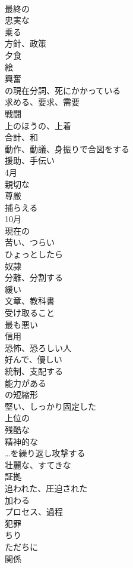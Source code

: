 \documentclass[8pt]{extreport}
\begin{document}
\begin{CJK}{UTF8}{min}
\\	最終の	
\\	忠実な	
\\	乗る	
\\	方針、政策	
\\	夕食	
\\	絵	
\\	興奮	
\\	の現在分詞、死にかかっている	
\\	求める、要求、需要	
\\	戦闘	
\\	上のほうの、上着	
\\	合計、和	
\\	動作、動議、身振りで合図をする	
\\	援助、手伝い	
\\	4月	
\\	親切な	
\\	尊厳	
\\	捕らえる	
\\	10月	
\\	現在の	
\\	苦い、つらい	
\\	ひょっとしたら	
\\	奴隷	
\\	分離、分割する	
\\	緩い	
\\	文章、教科書	
\\	受け取ること	
\\	最も悪い	
\\	信用	
\\	恐怖、恐ろしい人	
\\	好んで、優しい	
\\	統制、支配する	
\\	能力がある	
\\	の短縮形	
\\	堅い、しっかり固定した	
\\	上位の	
\\	残酷な	
\\	精神的な	
\\	…を繰り返し攻撃する	
\\	壮麗な、すてきな	
\\	証拠	
\\	追われた、圧迫された	
\\	加わる	
\\	プロセス、過程	
\\	犯罪	
\\	ちり	
\\	ただちに	
\\	関係	

\end{CJK}
\end{document}
